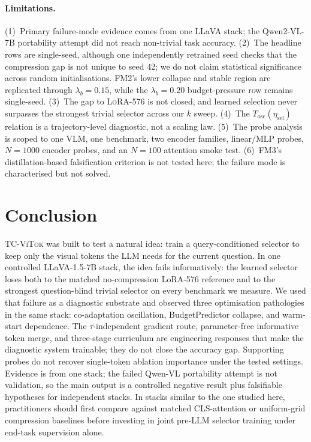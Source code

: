 \documentclass[runningheads]{llncs}
\newcommand{\Tosc}{T_{\mathrm{osc}}}
\newcommand{\etasel}{\eta_{\mathrm{sel}}}
\newcommand{\lbb}{\lambda_b}
\begin{document}
\paragraph{Limitations.}
(1)~Primary failure-mode evidence comes from one LLaVA stack; the
Qwen2-VL-7B portability attempt did not reach non-trivial task accuracy.
(2)~The headline rows are single-seed, although one independently
retrained seed checks that the compression gap is not unique to seed 42;
we do not claim statistical significance across random initialisations.
FM2's lower collapse and stable region are replicated through $\lbb{=}0.15$, while the
$\lbb{=}0.20$ budget-pressure row remains single-seed. (3)~The gap to
\textsc{LoRA-576} is not closed, and learned selection never surpasses
the strongest trivial selector across our $k$ sweep. (4)~The
$\Tosc(\etasel)$ relation is a trajectory-level diagnostic, not a
scaling law. (5)~The probe analysis is scoped to one VLM, one benchmark,
two encoder families, linear/MLP probes, $N{=}1000$ encoder probes, and
an $N{=}100$ attention smoke test. (6)~FM3's distillation-based
falsification criterion is not tested here; the failure mode is
characterised but not solved.

\section{Conclusion}

\textsc{TC-ViTok} was built to test a natural idea: train a
query-conditioned selector to keep only the visual tokens the LLM
needs for the current question. In one controlled LLaVA-1.5-7B stack,
the idea fails informatively: the learned selector loses both to
the matched no-compression LoRA-576 reference and to the strongest
question-blind trivial selector on every benchmark we measure. We used
that failure as a diagnostic substrate and observed three optimisation
pathologies in the same stack: co-adaptation oscillation,
BudgetPredictor collapse, and warm-start dependence. The
$\tau$-independent gradient route, parameter-free informative token
merge, and three-stage curriculum are engineering responses that make
the diagnostic system trainable; they do not close the accuracy gap.
Supporting probes do not recover single-token ablation importance
under the tested settings. Evidence is from one stack; the failed
Qwen-VL portability attempt is not validation, so the main output is a
controlled negative result plus falsifiable hypotheses for independent
stacks. In stacks similar to the one studied here, practitioners should
first compare against matched CLS-attention or uniform-grid compression
baselines before investing in joint pre-LLM selector training under
end-task supervision alone.



\end{document}
